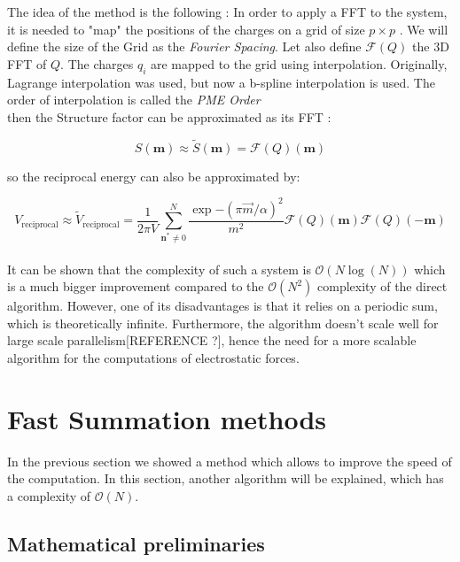 \documentclass[11pt,twoside,a4paper]{report}
\begin{document}
The idea of the method is the following : In order to apply a FFT to the system, it is needed to "map" the positions of the charges on a grid of size $ p \times p $ . We will define the size of the Grid as the \textit{Fourier Spacing}. Let also define $\mathcal{F}(Q)$ the 3D FFT of $Q$. The charges $q_i$ are mapped to the grid using interpolation. 
Originally, Lagrange interpolation was used, but now a b-spline interpolation is used. The order of interpolation is called the \textit{PME Order}\\

then the Structure factor can be approximated as its FFT :

\begin{equation}
   S(\textbf{m}) \approx \widetilde{S}(\textbf{m}) = \mathcal{F}(Q)(\textbf{m})
\end{equation}

so the reciprocal energy can also be approximated by:

\begin{equation}
   V_{\text{reciprocal}} \approx \widetilde{V}_{\text{reciprocal}}   =\frac{1}{2 \pi V} \sum\limits_{\textbf{n}^* \neq 0}^{N}  \frac{\exp{-(\pi \overrightarrow{m}/\alpha)^2}}{m^2}\mathcal{F}(Q)(\textbf{m})\mathcal{F}(Q)(-\textbf{m})
\end{equation} \\

It can be shown that the complexity of such a system is $\mathcal{O}(N \log(N))$ which is a much bigger improvement compared to the $\mathcal{O}(N^2)$ complexity of the direct algorithm. However, one of its disadvantages is that it relies on a periodic sum, which is theoretically infinite. Furthermore, the algorithm doesn't scale well for large scale parallelism[REFERENCE ?], hence the need for a more scalable algorithm for the computations of electrostatic forces.



\section{Fast Summation methods}

    In the previous section we showed a method which allows to improve the speed of the computation. In this section, another algorithm will be explained, which has a complexity of $\mathcal{O}(N)$.\\
    
	\subsection{Mathematical preliminaries}
	
\end{document}
